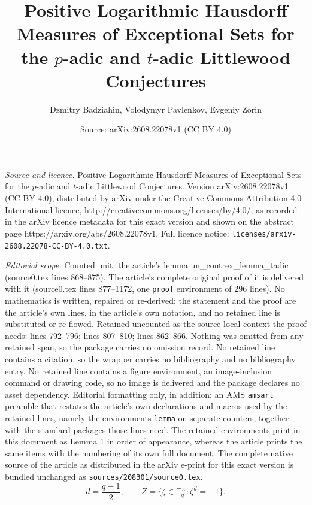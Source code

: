 \documentclass[10pt,a4paper]{amsart}
\title{Positive Logarithmic Hausdorff Measures of Exceptional Sets for the $p$-adic and $t$-adic Littlewood Conjectures}
\author{Dzmitry Badziahin, Volodymyr Pavlenkov, Evgeniy Zorin}
\date{Source: arXiv:2608.22078v1 (CC BY 4.0)}
\begin{document}
\maketitle

\noindent\emph{Source and licence.} Positive Logarithmic Hausdorff Measures of Exceptional Sets for the $p$-adic and $t$-adic Littlewood Conjectures. Version arXiv:2608.22078v1 (CC BY 4.0), distributed by arXiv under the Creative Commons Attribution 4.0 International licence, http://creativecommons.org/licenses/by/4.0/, as recorded in the arXiv licence metadata for this exact version and shown on the abstract page https://arxiv.org/abs/2608.22078v1. Full licence notice: \texttt{licenses/arxiv-2608.22078-CC-BY-4.0.txt}.\par\smallskip

\noindent\textit{Editorial scope.} Counted unit: the article's lemma un\_contrex\_lemma\_tadic (source0.tex lines 868--875). The article's complete original proof of it is delivered with it (source0.tex lines 877--1172, one \texttt{proof} environment of 296 lines). No mathematics is written, repaired or re-derived: the statement and the proof are the article's own lines, in the article's own notation, and no retained line is substituted or re-flowed.  Retained uncounted as the source-local context the proof needs: lines 792--796; lines 807--810; lines 862--866.  Nothing was omitted from any retained span, so the package carries no omission record.  No retained line contains a citation, so the wrapper carries no bibliography and no bibliography entry.  No retained line contains a figure environment, an image-inclusion command or drawing code, so no image is delivered and the package declares no asset dependency.  Editorial formatting only, in addition: an AMS \texttt{amsart} preamble that restates the article's own declarations and macros used by the retained lines, namely the environments \texttt{lemma} on separate counters, together with the standard packages those lines need.  The retained environments print in this document as Lemma 1 in order of appearance, whereas the article prints the same items with the numbering of its own full document.  The complete native source of the article as distributed in the arXiv e-print for this exact version is bundled unchanged as \texttt{sources/208301/source0.tex}.
\begin{equation} \label{eq:d-and-Z}
 d=\frac{q-1}{2},
 \qquad
 Z=\{\zeta\in\mathbb F_q^\times:\zeta^d=-1\}.
\end{equation}
\end{document}
